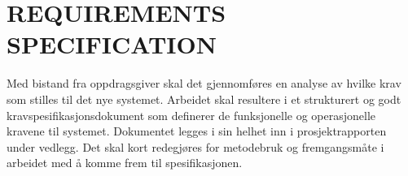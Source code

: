 \chapter{REQUIREMENTS SPECIFICATION}
\label{chap:requirements_spec}
Med bistand fra oppdragsgiver skal det gjennomføres en analyse av hvilke krav som stilles til det
nye systemet. Arbeidet skal resultere i et strukturert og godt kravspesifikasjonsdokument som
definerer de funksjonelle og operasjonelle kravene til systemet. Dokumentet legges i sin helhet
inn i prosjektrapporten under vedlegg. Det skal kort redegjøres for metodebruk og
fremgangsmåte i arbeidet med å komme frem til spesifikasjonen.